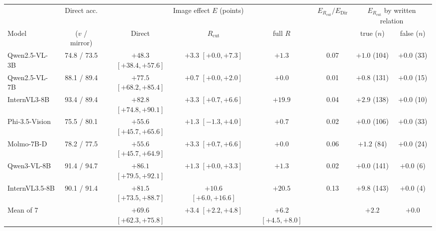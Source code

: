 \begin{tabular}{lccccccc}
\toprule
 & Direct acc. & \multicolumn{3}{c}{Image effect $E$ (points)} & $E_{R_\mathrm{cut}}/E_\mathrm{Dir}$ & \multicolumn{2}{c}{$E_{R_\mathrm{cut}}$ by written relation} \\
\cmidrule(lr){3-5} \cmidrule(lr){7-8}
Model & ($v$ / mirror) & Direct & $R_\mathrm{cut}$ & full $R$ & & true ($n$) & false ($n$) \\
\midrule
Qwen2.5-VL-3B & 74.8 / 73.5 & $+48.3$ {\scriptsize$[+38.4, +57.6]$} & $+3.3$ {\scriptsize$[+0.0, +7.3]$} & $+1.3$ & 0.07 & $+1.0$ (104) & $+0.0$ (33) \\
Qwen2.5-VL-7B & 88.1 / 89.4 & $+77.5$ {\scriptsize$[+68.2, +85.4]$} & $+0.7$ {\scriptsize$[+0.0, +2.0]$} & $+0.0$ & 0.01 & $+0.8$ (131) & $+0.0$ (15) \\
InternVL3-8B & 93.4 / 89.4 & $+82.8$ {\scriptsize$[+74.8, +90.1]$} & $+3.3$ {\scriptsize$[+0.7, +6.6]$} & $+19.9$ & 0.04 & $+2.9$ (138) & $+0.0$ (10) \\
Phi-3.5-Vision & 75.5 / 80.1 & $+55.6$ {\scriptsize$[+45.7, +65.6]$} & $+1.3$ {\scriptsize$[-1.3, +4.0]$} & $+0.7$ & 0.02 & $+0.0$ (106) & $+0.0$ (33) \\
Molmo-7B-D & 78.2 / 77.5 & $+55.6$ {\scriptsize$[+45.7, +64.9]$} & $+3.3$ {\scriptsize$[+0.7, +6.6]$} & $+0.0$ & 0.06 & $+1.2$ (84) & $+0.0$ (24) \\
Qwen3-VL-8B & 91.4 / 94.7 & $+86.1$ {\scriptsize$[+79.5, +92.1]$} & $+1.3$ {\scriptsize$[+0.0, +3.3]$} & $+1.3$ & 0.02 & $+0.0$ (141) & $+0.0$ (6) \\
InternVL3.5-8B & 90.1 / 91.4 & $+81.5$ {\scriptsize$[+73.5, +88.7]$} & $+10.6$ {\scriptsize$[+6.0, +16.6]$} & $+20.5$ & 0.13 & $+9.8$ (143) & $+0.0$ (4) \\
\midrule
Mean of 7 & & $+69.6$ {\scriptsize$[+62.3, +75.8]$} & $+3.4$ {\scriptsize$[+2.2, +4.8]$} & $+6.2$ {\scriptsize$[+4.5, +8.0]$} & & $+2.2$ & $+0.0$ \\
\bottomrule
\end{tabular}
